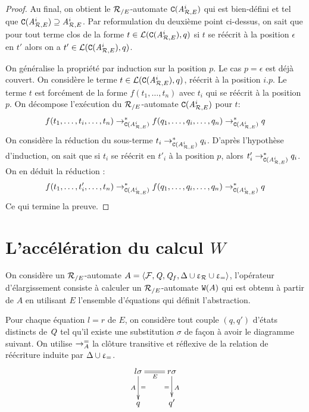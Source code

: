 \begin{proof}
  
  Au final, on obtient le ${\mathcal R_{/E}}$-automate $\mathtt{C}({\mathit A}_{\mathcal R,E}^i)$ qui est bien-défini et tel que $\mathtt{C}({\mathit A}_{\mathcal R,E}^i) \supseteq {\mathit A}_{\mathcal R,E}^i$.
  Par reformulation du deuxième point ci-dessus, on sait que pour tout terme clos de la forme $t \in \mathcal{L}(\mathtt{C}({\mathit A}_{\mathcal R,E}^i),q)$ si $t$ se réécrit à la position $\epsilon$
  en $t'$ alors on a $t' \in \mathcal{L}(\mathtt{C}({\mathit A}_{\mathcal R,E}^i),q)$.

  On généralise la propriété par induction sur la position $p$. Le cas $p = \epsilon$ est déjà couvert.
  On considère le terme $t \in \mathcal{L}(\mathtt{C}({\mathit A}_{\mathcal R,E}^i),q)$, réécrit à la position $i.p$. Le terme $t$
  est forcément de la forme $f(t_1, \dots, t_n)$ avec $t_i$ qui se réécrit à la position $p$.
  On décompose l'exécution du ${\mathcal R_{/E}}$-automate $\mathtt{C}({\mathit A}_{\mathcal R,E}^i)$ pour $t$:
  \[ f(t_1, \dots,t_i, \dots,t_n) \rightarrow^*_{\mathtt{C}({\mathit A}_{\mathcal R,E}^i)} f(q_1, \dots,q_i, \dots,q_n) \rightarrow^*_{\mathtt{C}({\mathit A}_{\mathcal R,E}^i)} q \]
  On considère la réduction du sous-terme $t_i \rightarrow^*_{\mathtt{C}({\mathit A}_{\mathcal R,E}^i)} q_i$. D'après l'hypothèse d'induction,
  on sait que si $t_i$ se réécrit en $t'_i$ à la position $p$, alors $t'_i\rightarrow^*_{\mathtt{C}({\mathit A}_{\mathcal R,E}^i)} q_i$. 
  On en déduit la réduction :
  \[ f(t_1, \dots, t'_i, \dots,t_n) \rightarrow^*_{\mathtt{C}({\mathit A}_{\mathcal R,E}^i)} f(q_1, \dots,q_i, \dots,q_n) \rightarrow^*_{\mathtt{C}({\mathit A}_{\mathcal R,E}^i)} q \]
  Ce qui termine la preuve.
\end{proof}


\section{L'accélération du calcul $W$}

On considère un ${\mathcal R_{/E}}$-automate $A = \langle \mathcal{F}, \mathit Q, \mathit Q_f, \Delta \cup \upvarepsilon_{\mathcal R}
\cup \upvarepsilon_{=} \rangle$, l'opérateur d'élargissement consiste à calculer un 
${\mathcal R_{/E}}$-automate $\mathtt{W}(A)$ qui est obtenu à partir de $A$ en utilisant $E$
l'ensemble d'équations qui définit l'abstraction.

Pour chaque équation $l = r$ de $E$, on considère tout couple
$(q, q')$ d'états distincts de $\mathit Q$ tel qu'il existe une
substitution $\sigma$ de façon à avoir le diagramme suivant.
On utilise $\rightarrow^=_{A}$ la clôture transitive et réflexive
de la relation de réécriture induite par $\Delta \cup \upvarepsilon_{=}$.  
\[\xymatrix{
  l\sigma \ar@{=}[r]_{E}\ar[d]^{=}_{A} & r\sigma \ar[d]^{A}_{=}\\
  q & q'
}\]

